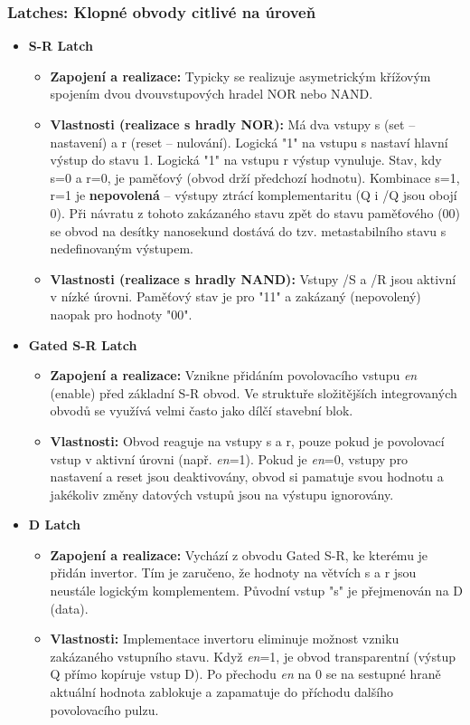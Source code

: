     \subsubsection{Latches: Klopné obvody citlivé na úroveň}
        \begin{itemize}
            \item \textbf{S-R Latch}
            \begin{itemize}
                \item \textbf{Zapojení a realizace:} Typicky se realizuje asymetrickým křížovým spojením dvou dvouvstupových hradel NOR nebo NAND.
                \item \textbf{Vlastnosti (realizace s hradly NOR):} Má dva vstupy s (set – nastavení) a r (reset – nulování). Logická "1" na vstupu s nastaví hlavní výstup do stavu 1. Logická "1" na vstupu r výstup vynuluje. Stav, kdy s=0 a r=0, je paměťový (obvod drží předchozí hodnotu). Kombinace s=1, r=1 je \textbf{nepovolená} – výstupy ztrácí komplementaritu (Q i /Q jsou obojí 0). Při návratu z tohoto zakázaného stavu zpět do stavu paměťového (00) se obvod na desítky nanosekund dostává do tzv. metastabilního stavu s nedefinovaným výstupem.
                \item \textbf{Vlastnosti (realizace s hradly NAND):} Vstupy /S a /R jsou aktivní v nízké úrovni. Paměťový stav je pro "11" a zakázaný (nepovolený) naopak pro hodnoty "00".
            \end{itemize}
        
            \item \textbf{Gated S-R Latch}
            \begin{itemize}
                \item \textbf{Zapojení a realizace:} Vznikne přidáním povolovacího vstupu \textit{en} (enable) před základní S-R obvod. Ve struktuře složitějších integrovaných obvodů se využívá velmi často jako dílčí stavební blok.
                \item \textbf{Vlastnosti:} Obvod reaguje na vstupy s a r, pouze pokud je povolovací vstup v aktivní úrovni (např. \textit{en}=1). Pokud je \textit{en}=0, vstupy pro nastavení a reset jsou deaktivovány, obvod si pamatuje svou hodnotu a jakékoliv změny datových vstupů jsou na výstupu ignorovány.
            \end{itemize}
        
            \item \textbf{D Latch}
            \begin{itemize}
                \item \textbf{Zapojení a realizace:} Vychází z obvodu Gated S-R, ke kterému je přidán invertor. Tím je zaručeno, že hodnoty na větvích s a r jsou neustále logickým komplementem. Původní vstup "s" je přejmenován na D (data).
                \item \textbf{Vlastnosti:} Implementace invertoru eliminuje možnost vzniku zakázaného vstupního stavu. Když \textit{en}=1, je obvod transparentní (výstup Q přímo kopíruje vstup D). Po přechodu \textit{en} na 0 se na sestupné hraně aktuální hodnota zablokuje a zapamatuje do příchodu dalšího povolovacího pulzu.
            \end{itemize}
        \end{itemize}
